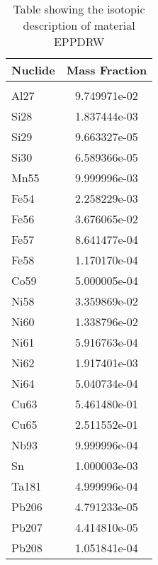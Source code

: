 \begin{centering}
\begin{table}[ht!]
\begin{tabular}{l | c}
\hline
Nuclide & Mass Fraction\\
\hline
\\
Al27 & 9.749971e-02\\
Si28 & 1.837444e-03\\
Si29 & 9.663327e-05\\
Si30 & 6.589366e-05\\
Mn55 & 9.999996e-03\\
Fe54 & 2.258229e-03\\
Fe56 & 3.676065e-02\\
Fe57 & 8.641477e-04\\
Fe58 & 1.170170e-04\\
Co59 & 5.000005e-04\\
Ni58 & 3.359869e-02\\
Ni60 & 1.338796e-02\\
Ni61 & 5.916763e-04\\
Ni62 & 1.917401e-03\\
Ni64 & 5.040734e-04\\
Cu63 & 5.461480e-01\\
Cu65 & 2.511552e-01\\
Nb93 & 9.999996e-04\\
Sn & 1.000003e-03\\
Ta181 & 4.999996e-04\\
Pb206 & 4.791233e-05\\
Pb207 & 4.414810e-05\\
Pb208 & 1.051841e-04
\end{tabular}
\caption{Table showing the isotopic description of material EPPDRW}
\label{table:material_EPPDRW}
\end{table}\clearpage


\end{centering}
